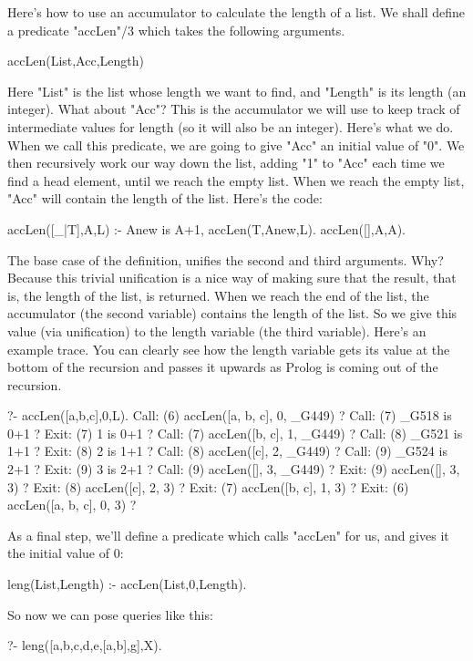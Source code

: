 Here's how to use an accumulator to calculate the length of a list.
We shall define a predicate "accLen"/3 which takes the following
arguments.
\begin{LPNcodedisplay}
accLen(List,Acc,Length)
\end{LPNcodedisplay}
Here "List" is the list whose length we want to find, and "Length" is
its length (an integer).  What about "Acc"?  This is the accumulator
we will use to keep track of intermediate values for length (so it
will also be an integer).  Here's what we do.  When we call this
predicate, we are going to give "Acc" an initial value of "0".  We
then recursively work our way down the list, adding "1" to "Acc" each
time we find a head element, until we reach the empty list.  When we
reach the empty list, "Acc" will contain the length of the list.
Here's the code:
\begin{LPNcodedisplay}
accLen([_|T],A,L) :-  Anew is A+1, accLen(T,Anew,L).
accLen([],A,A).
\end{LPNcodedisplay}

The base case of the definition, unifies the second and third
arguments.  Why?  Because this trivial unification is a nice way of
making sure that the result, that is, the length of the list, is
returned. When we reach the end of the list, the accumulator (the
second variable) contains the length of the list.  So we give this
value (via unification) to the length variable (the third variable).
Here's an example trace. You can clearly see how the length variable
gets its value at the bottom of the recursion and passes it upwards as
Prolog is coming out of the recursion.
\begin{LPNcodedisplay}
?- accLen([a,b,c],0,L).
   Call: (6) accLen([a, b, c], 0, _G449) ?
   Call: (7) _G518 is 0+1 ?
   Exit: (7) 1 is 0+1 ?
   Call: (7) accLen([b, c], 1, _G449) ?
   Call: (8) _G521 is 1+1 ?
   Exit: (8) 2 is 1+1 ?
   Call: (8) accLen([c], 2, _G449) ?
   Call: (9) _G524 is 2+1 ?
   Exit: (9) 3 is 2+1 ?
   Call: (9) accLen([], 3, _G449) ?
   Exit: (9) accLen([], 3, 3) ?
   Exit: (8) accLen([c], 2, 3) ?
   Exit: (7) accLen([b, c], 1, 3) ?
   Exit: (6) accLen([a, b, c], 0, 3) ?
\end{LPNcodedisplay}

As a final step, we'll define a predicate which calls "accLen"
for us, and gives it the initial value of 0:
\begin{LPNcodedisplay}
leng(List,Length) :- accLen(List,0,Length).
\end{LPNcodedisplay}
So now we can pose queries like this:
\begin{LPNcodedisplay}
?- leng([a,b,c,d,e,[a,b],g],X).
\end{LPNcodedisplay}


